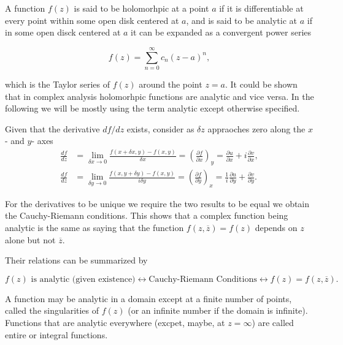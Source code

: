 \documentclass[english,a4paper,12pt]{report}
\begin{document}
A function \(f(z)\) is said to be holomorhpic at a point \(a\) if it is differentiable at every point within some open disk centered at \(a\), and is said to be analytic at \(a\) if in some open disck centered at \(a\) it can be expanded as a convergent power series 

\begin{equation}
    f(z) = \sum_{n=0}^{\infty} c_{n} (z-a)^{n},   
\end{equation}

which is the Taylor series of \(f(z)\) around the point \(z = a\). It could be shown that in complex analysis holomorhpic functions are analytic and vice versa. In the following we will be mostly using the term analytic except otherwise specified.

Given that the derivative \(df /dz\) exists, consider as \(\delta z\) appraoches zero along the \(x\)- and \(y\)- axes  
\begin{equation}
    \begin{aligned}
        \frac{df}{dz} &= \lim_{\delta x \to 0}  \frac{f(x+\delta x,y)-f(x,y)}{\delta x} = \left( \frac{\partial f}{\partial x} \right)_{y} = \frac{\partial u}{\partial x} + i\frac{\partial v}{\partial x} ,\\
        \frac{df}{dz} &= \lim_{\delta y \to 0}   \frac{f(x,y+\delta y)-f(x,y)}{i \delta y} = \left( \frac{\partial f}{\partial y} \right)_{x} = \frac{1}{i} \frac{\partial u}{\partial y} + \frac{\partial v}{\partial y}.
    \end{aligned}
\end{equation}

For the derivatives to be unique we require the two results to be equal we obtain the Cauchy-Riemann conditions. This shows that a complex function being analytic is the same as saying that the function \(f(z,\overline{z} ) = f(z)\) depends on \(z\) alone but not \(\overline{z} \). 

Their relations can be summarized by 

\begin{equation}
    f(z) \text{ is analytic (given existence)} \longleftrightarrow \text{Cauchy-Riemann Conditions} \longleftrightarrow f(z) = f(z,\overline{z} ).
\end{equation}

A function may be analytic in a domain except at a finite number of points, called the singularities of \(f(z)\) (or an infinite number if the domain is infinite). Functions that are analytic everywhere (excpet, maybe, at \(z = \infty\)) are called entire or integral functions.
\end{document}

